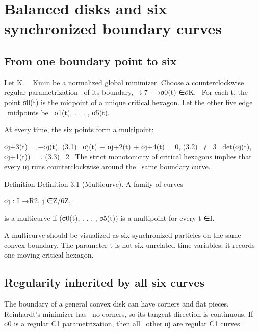 \chapter{Balanced disks and six synchronized boundary curves}
\section{From one boundary point to six}

\begin{displaytext}
Let K = Kmin be a normalized global minimizer. Choose a counterclockwise regular parametrization \
of its boundary, \
t 7−→σ0(t) ∈∂K. \
For each t, the point σ0(t) is the midpoint of a unique critical hexagon. Let the other five edge \
midpoints be \
σ1(t), . . . , σ5(t).
\end{displaytext}

At every time, the six points form a multipoint:


\begin{displaytext}
σj+3(t) = −σj(t), (3.1) \
σj(t) + σj+2(t) + σj+4(t) = 0, (3.2) \
√ \
3 \
det(σj(t), σj+1(t)) = . (3.3) \
2 \
The strict monotonicity of critical hexagons implies that every σj runs counterclockwise around the \
same boundary curve.
\end{displaytext}

\begin{statementbox}{Definition}
Definition 3.1 (Multicurve). A family of curves
\end{statementbox}

\begin{displaytext}
σj : I →R2, j ∈Z/6Z,
\end{displaytext}

\begin{displaytext}
is a multicurve if (σ0(t), . . . , σ5(t)) is a multipoint for every t ∈I.
\end{displaytext}

A multicurve should be visualized as six synchronized particles on the same convex boundary. The parameter t is not six unrelated time variables; it records one moving critical hexagon.


\section{Regularity inherited by all six curves}

\begin{displaytext}
The boundary of a general convex disk can have corners and flat pieces. Reinhardt’s minimizer has \
no corners, so its tangent direction is continuous. If σ0 is a regular C1 parametrization, then all \
other σj are regular C1 curves.
\end{displaytext}


